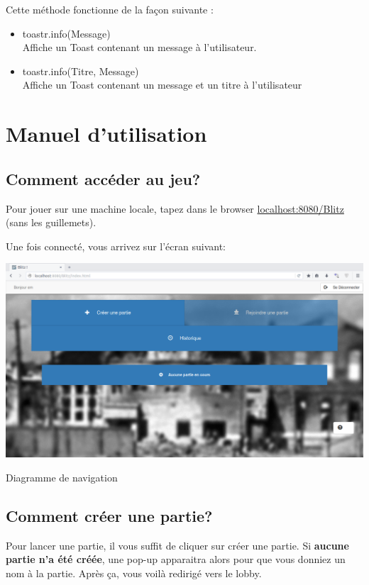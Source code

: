 \documentclass[11pt]{scrreprt}
\begin{document}
    Cette méthode fonctionne de la façon suivante :

    \begin{itemize}
        \item toastr.info(\og Message\fg)\\ Affiche un Toast contenant un message à l'utilisateur.
        \item toastr.info(\og Titre\fg, \og Message\fg)\\ Affiche un Toast contenant un message et un titre à l'utilisateur
    \end{itemize}
    \section{Manuel d'utilisation}
    \subsection{Comment accéder au jeu?}
    Pour jouer sur une machine locale, tapez dans le browser \og \url{localhost:8080/Blitz}\fg{} (sans les guillemets).

    Une fois connecté, vous arrivez sur l'écran suivant:

    \begin{table}[H]
        \centering
        \includegraphics[width=\textwidth]{images/accueil.png}
        \caption{Diagramme de navigation}
    \end{table}

    \subsection{Comment créer une partie?}
    Pour lancer une partie, il vous suffit de cliquer sur créer une partie.
    Si \textbf{aucune partie n'a été créée}, une pop-up apparaitra alors pour que vous donniez un nom à la partie. Après ça, vous voilà redirigé vers le lobby.
\end{document}
